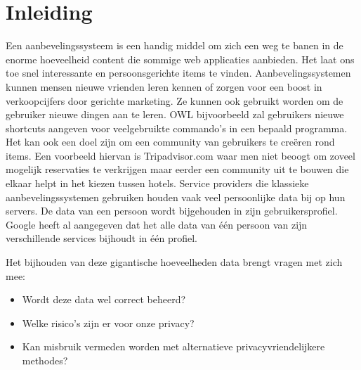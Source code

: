 \chapter{Inleiding}
Een aanbevelingssysteem is een handig middel om zich een weg te banen in de enorme hoeveelheid content die sommige web applicaties aanbieden. Het laat ons toe snel interessante en persoonsgerichte items te vinden. 
Aanbevelingssystemen kunnen mensen nieuwe vrienden leren kennen of zorgen voor een boost in verkoopcijfers door gerichte marketing. Ze kunnen ook gebruikt worden om de gebruiker nieuwe dingen aan te leren. OWL \cite{Linton00owl} bijvoorbeeld zal gebruikers nieuwe shortcuts aangeven voor veelgebruikte commando’s in een bepaald programma. Het kan ook een doel zijn om een community van gebruikers te cre\"eren rond items. Een voorbeeld hiervan is Tripadvisor.com waar men niet beoogt om zoveel mogelijk reservaties te verkrijgen maar eerder een community uit te bouwen die elkaar helpt in het kiezen tussen hotels. 
Service providers die klassieke aanbevelingssystemen gebruiken houden vaak veel persoonlijke data bij op hun servers. De data van een persoon wordt bijgehouden in zijn gebruikersprofiel. Google heeft al aangegeven dat het alle data van \'e\'en persoon van zijn verschillende services bijhoudt in \'e\'en profiel. 

Het bijhouden van deze gigantische hoeveelheden data brengt vragen met zich mee:
\begin{itemize}
 
\item Wordt deze data wel correct beheerd? 
\item Welke risico's zijn er voor onze privacy?
\item Kan misbruik vermeden worden met alternatieve privacyvriendelijkere methodes?
\end{itemize}

